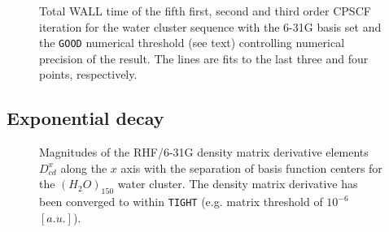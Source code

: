 \documentclass[prl,aps,twocolumn,showpacs,twocolumngrid,superbib]{revtex4}
\begin{document}
\begin{figure}[t]
  \caption{\protect
    Total WALL time of the fifth first, second and third order
    CPSCF iteration for the water cluster sequence with the 6-31G
    basis set and the {\tt GOOD} numerical threshold (see text) 
    controlling numerical precision of the result. The lines
    are fits to the last three and four points, respectively.
  }\label{Mix_scaling}
\end{figure}



\subsection{Exponential decay}

\begin{figure}[t]
  \caption{\protect
    Magnitudes of the RHF/6-31G density matrix derivative elements $D^{x}_{cd}$
    along the $x$ axis with the separation of basis function centers
    for the $(H_2O)_{150}$ water cluster. The density matrix 
    derivative has been converged to within {\tt TIGHT} (e.g. 
    matrix threshold of $10^{-6}$ $[a.u.]$).
  }\label{fig:Alpha_Decay}
\end{figure}
\end{document}
